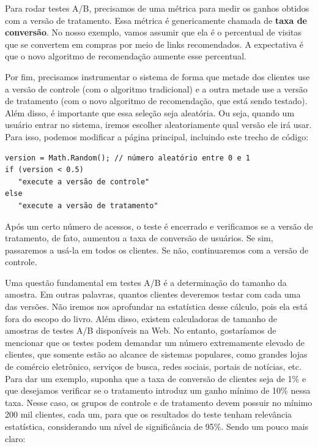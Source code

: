 \documentclass[
  11pt,
  twoside]{book}
\begin{document}
Para rodar testes A/B, precisamos de uma métrica para medir os ganhos
obtidos com a versão de tratamento. Essa métrica é genericamente chamada
de \textbf{taxa de conversão}. No nosso exemplo, vamos assumir que ela é
o percentual de visitas que se convertem em compras por meio de links
recomendados. A expectativa é que o novo algoritmo de recomendação
aumente esse percentual.

Por fim, precisamos instrumentar o sistema de forma que metade dos
clientes use a versão de controle (com o algoritmo tradicional) e a
outra metade use a versão de tratamento (com o novo algoritmo de
recomendação, que está sendo testado). Além disso, é importante que essa
seleção seja aleatória. Ou seja, quando um usuário entrar no sistema,
iremos escolher aleatoriamente qual versão ele irá usar. Para isso,
podemos modificar a página principal, incluindo este trecho de código:

\begin{lstlisting}
version = Math.Random(); // número aleatório entre 0 e 1
if (version < 0.5)
   "execute a versão de controle"
else                                                 
   "execute a versão de tratamento"
\end{lstlisting}

Após um certo número de acessos, o teste é encerrado e verificamos se a
versão de tratamento, de fato, aumentou a taxa de conversão de usuários.
Se sim, passaremos a usá-la em todos os clientes. Se não, continuaremos
com a versão de controle.

Uma questão fundamental em testes A/B é a determinação do tamanho da
amostra. Em outras palavras, quantos clientes deveremos testar com cada
uma das versões. Não iremos nos aprofundar na estatística desse cálculo,
pois ela está fora do escopo do livro. Além disso, existem calculadoras
de tamanho de amostras de testes A/B disponíveis na Web. No entanto,
gostaríamos de mencionar que os testes podem demandar um número
extremamente elevado de clientes, que somente estão ao alcance de
sistemas populares, como grandes lojas de comércio eletrônico, serviços
de busca, redes sociais, portais de notícias, etc. Para dar um exemplo,
suponha que a taxa de conversão de clientes seja de 1\% e que desejamos
verificar se o tratamento introduz um ganho mínimo de 10\% nessa taxa.
Nesse caso, os grupos de controle e de tratamento devem possuir no
mínimo 200 mil clientes, cada um, para que os resultados do teste tenham
relevância estatística, considerando um nível de significância de 95\%.
Sendo um pouco mais claro:
\end{document}
